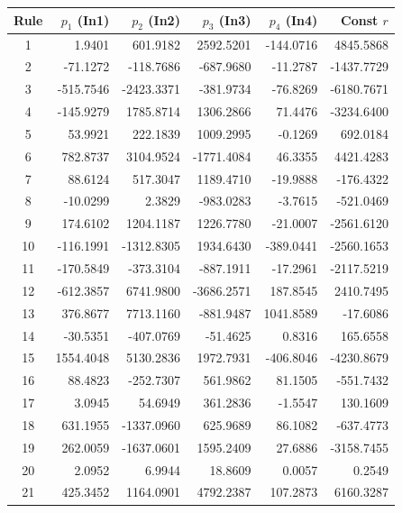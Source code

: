 \documentclass[12pt]{article}
\begin{document}
\begin{table}[H]
\centering
\small
\setlength{\tabcolsep}{4pt} %
\begin{tabular}{|c|r|r|r|r|r|}
\hline
\textbf{Rule} & \textbf{$p_1$ (In1)} & \textbf{$p_2$ (In2)} & \textbf{$p_3$ (In3)} & \textbf{$p_4$ (In4)} & \textbf{Const $r$} \\ \hline
1 & 1.9401 & 601.9182 & 2592.5201 & -144.0716 & 4845.5868 \\ \hline
2 & -71.1272 & -118.7686 & -687.9680 & -11.2787 & -1437.7729 \\ \hline
3 & -515.7546 & -2423.3371 & -381.9734 & -76.8269 & -6180.7671 \\ \hline
4 & -145.9279 & 1785.8714 & 1306.2866 & 71.4476 & -3234.6400 \\ \hline
5 & 53.9921 & 222.1839 & 1009.2995 & -0.1269 & 692.0184 \\ \hline
6 & 782.8737 & 3104.9524 & -1771.4084 & 46.3355 & 4421.4283 \\ \hline
7 & 88.6124 & 517.3047 & 1189.4710 & -19.9888 & -176.4322 \\ \hline
8 & -10.0299 & 2.3829 & -983.0283 & -3.7615 & -521.0469 \\ \hline
9 & 174.6102 & 1204.1187 & 1226.7780 & -21.0007 & -2561.6120 \\ \hline
10 & -116.1991 & -1312.8305 & 1934.6430 & -389.0441 & -2560.1653 \\ \hline
11 & -170.5849 & -373.3104 & -887.1911 & -17.2961 & -2117.5219 \\ \hline
12 & -612.3857 & 6741.9800 & -3686.2571 & 187.8545 & 2410.7495 \\ \hline
13 & 376.8677 & 7713.1160 & -881.9487 & 1041.8589 & -17.6086 \\ \hline
14 & -30.5351 & -407.0769 & -51.4625 & 0.8316 & 165.6558 \\ \hline
15 & 1554.4048 & 5130.2836 & 1972.7931 & -406.8046 & -4230.8679 \\ \hline
16 & 88.4823 & -252.7307 & 561.9862 & 81.1505 & -551.7432 \\ \hline
17 & 3.0945 & 54.6949 & 361.2836 & -1.5547 & 130.1609 \\ \hline
18 & 631.1955 & -1337.0960 & 625.9689 & 86.1082 & -637.4773 \\ \hline
19 & 262.0059 & -1637.0601 & 1595.2409 & 27.6886 & -3158.7455 \\ \hline
20 & 2.0952 & 6.9944 & 18.8609 & 0.0057 & 0.2549 \\ \hline
21 & 425.3452 & 1164.0901 & 4792.2387 & 107.2873 & 6160.3287 \\ \hline

\end{tabular}
\end{table}
\end{document}
